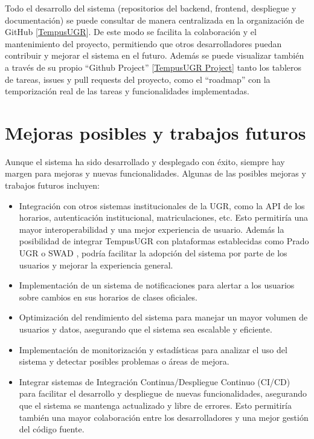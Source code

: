Todo el desarrollo del sistema (repositorios del backend, frontend, despliegue y documentación) se puede consultar de manera centralizada en la organización de GitHub [\href{https://github.com/TempusUGR}{TempusUGR}]. De este modo se facilita la colaboración y el mantenimiento del proyecto, permitiendo que otros desarrolladores puedan contribuir y mejorar el sistema en el futuro.
Además se puede visualizar también a través de su propio ``Github Project'' [\href{https://github.com/orgs/TempusUGR/projects/3}{TempusUGR Project}] tanto los tableros de tareas, issues y pull requests del proyecto, como el ``roadmap'' con la temporización real de las tareas y funcionalidades implementadas.

\section{Mejoras posibles y trabajos futuros}

Aunque el sistema ha sido desarrollado y desplegado con éxito, siempre hay margen para mejoras y nuevas funcionalidades. Algunas de las posibles mejoras y trabajos futuros incluyen:
\begin{itemize}
    \item Integración con otros sistemas institucionales de la UGR, como la API de los horarios, autenticación institucional, matriculaciones, etc. Esto permitiría una mayor interoperabilidad y una mejor experiencia de usuario.
    Además la posibilidad de integrar TempusUGR con plataformas establecidas como Prado UGR o SWAD , podría facilitar la adopción del sistema por parte de los usuarios y mejorar la experiencia general.
    \item Implementación de un sistema de notificaciones para alertar a los usuarios sobre cambios en sus horarios de clases oficiales.
    \item Optimización del rendimiento del sistema para manejar un mayor volumen de usuarios y datos, asegurando que el sistema sea escalable y eficiente.
    \item Implementación  de monitorización y estadísticas para analizar el uso del sistema y detectar posibles problemas o áreas de mejora.
    \item Integrar sistemas de Integración Continua/Despliegue Continuo (CI/CD) para facilitar el desarrollo y despliegue de nuevas funcionalidades, asegurando que el sistema se mantenga actualizado y libre de errores. Esto permitiría también una mayor colaboración entre los desarrolladores y una mejor gestión del código fuente.
\end{itemize}
